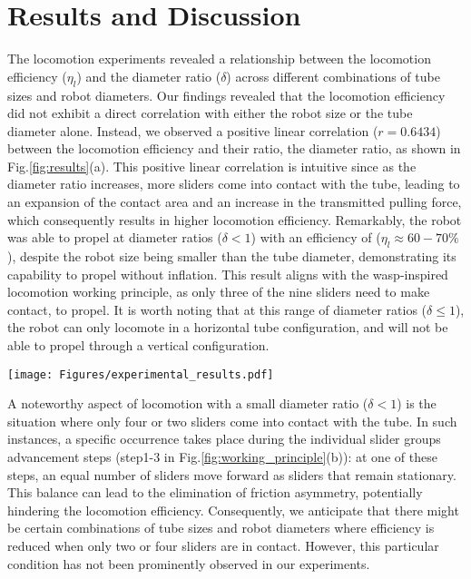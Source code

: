 \documentclass[letterpaper, 10 pt, conference]{ieeeconf}  %
\begin{document}
\section{Results and Discussion}
The locomotion experiments revealed a relationship between the locomotion efficiency ($\eta_{l}$) and the diameter ratio ($\delta$) across different combinations of tube sizes and robot diameters.  Our findings revealed that the locomotion efficiency did not exhibit a direct correlation with either the robot size or the tube diameter alone. Instead, we observed a positive linear correlation ($r=0.6434$) between the locomotion efficiency and their ratio, the diameter ratio, as shown in Fig.\ref{fig:results}(a). This positive linear correlation is intuitive since as the diameter ratio increases, more sliders come into contact with the tube, leading to an expansion of the contact area and an increase in the transmitted pulling force, which consequently results in higher locomotion efficiency. Remarkably, the robot was able to propel at diameter ratios ($\delta<1$) with an efficiency of ($\eta_{l} \approx 60-70\%$), despite the robot size being smaller than the tube diameter, demonstrating its capability to propel without inflation. This result aligns with the wasp-inspired locomotion working principle, as only three of the nine sliders need to make contact, to propel. It is worth noting that at this range of diameter ratios ($\delta \leq 1$), the robot can only locomote in a horizontal tube configuration, and will not be able to propel through a vertical configuration. 

\begin{figure*}[!t]
    \centering
    \texttt{[image: Figures/experimental\_results.pdf]}
    \caption{Experimental results. (a) shows the correlation between the locomotion efficiency ($\eta_{l}$) of the robot and the diameter ratio ($\delta$). (b) shows the locomotion efficiency ($\eta_{l}$) of the robot in tubes of different shapes and at different payloads. (c) shows the normal (holding) force of a single mechanical inflator as a function of the diameter ratio.}
    \label{fig:results}
\end{figure*}

A noteworthy aspect of locomotion with a small diameter ratio ($\delta<1$) is the situation where only four or two sliders come into contact with the tube. In such instances, a specific occurrence takes place during the individual slider groups advancement steps (step1-3 in Fig.\ref{fig:working_principle}(b)): at one of these steps, an equal number of sliders move forward as sliders that remain stationary. This balance can lead to the elimination of friction asymmetry, potentially hindering the locomotion efficiency. Consequently, we anticipate that there might be certain combinations of tube sizes and robot diameters where efficiency is reduced when only two or four sliders are in contact. However, this particular condition has not been prominently observed in our experiments.
\end{document}
